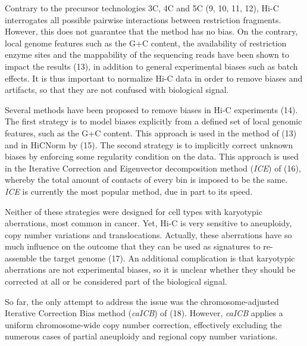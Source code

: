 \documentclass[a4,center,fleqn]{NAR}
\providecommand{\DIFadd}[1]{{\protect\color{red}#1}} %
\providecommand{\DIFdel}[1]{{\protect}}                      %
\providecommand{\DIFaddbegin}{} %
\providecommand{\DIFaddend}{} %
\providecommand{\DIFdelbegin}{} %
\providecommand{\DIFdelend}{} %
\begin{document}
Contrary to the precursor technologies 3C, 4C and 5C
(9, 10, 11, 12), Hi-C interrogates all possible
pairwise interactions between restriction fragments. However, this does
not guarantee that the method has no bias.  On the contrary, local genome
features such as the G+C content, the availability of restriction enzyme
sites and the mappability of the sequencing reads have been shown to
impact the results (13), in addition to general
experimental biases such as batch effects. It is thus important to
normalize Hi-C data in order to remove biases and artifacts, so that they
are not confused with biological signal.

Several methods have been proposed to remove biases in Hi-C experiments
(14). The first strategy is to model biases
explicitly from a defined set of local genomic features, such as the G+C
content. This approach is used in the method of
(13) and in \DIFdelbegin \DIFdel{Hicnorm }\DIFdelend \DIFaddbegin \DIFadd{HiCNorm }\DIFaddend by (15).
The second strategy is to implicitly correct unknown biases by enforcing
some regularity condition on the data. This approach is used in the
Iterative Correction and Eigenvector decomposition method (\textit{ICE})
of (16), whereby the total amount of contacts of
every bin is imposed to be the same. \textit{ICE} is currently the most
popular method, due in part to its speed.

Neither of these strategies were designed for cell types with karyotypic
aberrations, most common in cancer. Yet, Hi-C is very sensitive to
aneuploidy, copy number variations and translocations. Actually, these
aberrations have so much influence on the outcome that they can be used as
\DIFdelbegin \DIFdel{signatureto }\DIFdelend \DIFaddbegin \DIFadd{signatures to }\DIFaddend re-assemble the target genome (17). An
additional complication is that karyotypic aberrations are not
experimental biases, so it is unclear whether they should be corrected at
all or be considered part of the biological signal.

\enlargethispage{-65.1pt}

So far, the only attempt to address the issue was the chromosome-adjusted
Iterative Correction Bias method (\textit{caICB}) of
(18). However, \textit{caICB} applies a uniform
chromosome-wide copy number correction, effectively excluding the numerous
cases of partial aneuploidy and regional copy number variations.
\end{document}
